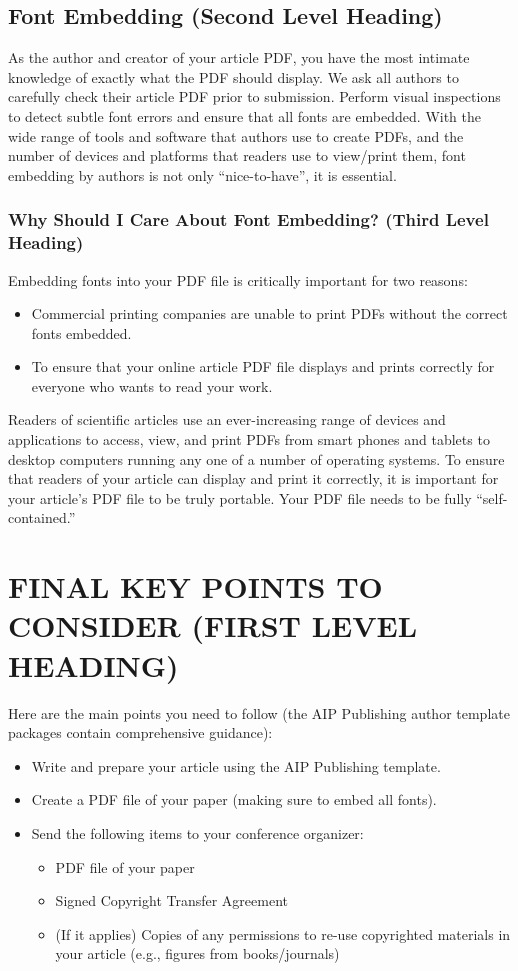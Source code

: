 \documentclass{aip-cp}
\begin{document}
\subsection{Font Embedding (Second Level Heading)}
As the author and creator of your article PDF, you have the most intimate knowledge of exactly what the PDF should display. We ask all authors to carefully check their article PDF prior to submission. Perform visual inspections to detect subtle font errors and ensure that all fonts are embedded. With the wide range of tools and software that authors use to create PDFs, and the number of devices and platforms that readers use to view/print them, font embedding by authors is not only ``nice-to-have'', it is essential. 

\subsubsection{Why Should I Care About Font Embedding? (Third Level Heading)}
Embedding fonts into your PDF file is critically important for two reasons:
\begin{itemize}
\item Commercial printing companies are unable to print PDFs without the correct fonts embedded.
\item To ensure that your online article PDF file displays and prints correctly for everyone who wants to read your work.
\end{itemize}

Readers of scientific articles use an ever-increasing range of devices and applications to access, view, and print PDFs  from smart phones and tablets to desktop computers running any one of a number of operating systems. To ensure that readers of  your article can display and print it correctly, it is important for your article's PDF file to be truly portable. Your PDF file needs to be fully ``self-contained.''%

\section{FINAL KEY POINTS TO CONSIDER (FIRST LEVEL HEADING)}
Here are the main points you need to follow (the AIP Publishing author template packages contain comprehensive guidance):

\begin{itemize}
\item Write and prepare your article using the AIP Publishing template.
\item Create a PDF file of your paper (making sure to embed all fonts).
\item Send the following items to your conference organizer:
\begin{itemize}
\item PDF file of your paper
\item Signed Copyright Transfer Agreement
\item (If it applies) Copies of any permissions to re-use copyrighted materials in your article (e.g., figures from books/journals)
\end{itemize}
\end{itemize}
\end{document}
